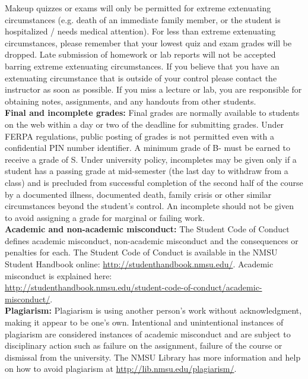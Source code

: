 \documentclass{article}
\begin{document}
Makeup quizzes or exams will only be permitted for extreme extenuating circumstances (e.g. death of an immediate family member, or the student is hospitalized / needs medical attention). For less than extreme extenuating circumstances, please remember that your lowest quiz and exam grades will be dropped. Late submission of homework or lab reports will not be accepted barring extreme extenuating circumstances. If you believe that you have an extenuating circumstance that is outside of your control please contact the instructor as soon as possible. If you miss a lecture or lab, you are responsible for obtaining notes, assignments, and any handouts from other students. \\

\noindent\textbf{Final and incomplete grades:} Final grades are normally available to students on the web within a day or two of the deadline for submitting grades. Under FERPA regulations, public posting of grades is not permitted even with a confidential PIN number identifier. A minimum grade of B- must be earned to receive a grade of S. Under university policy, incompletes may be given only if a student has a passing grade at mid-semester (the last day to withdraw from a class) and is precluded from successful completion of the second half of the course by a documented illness, documented death, family crisis or other similar circumstances beyond the student's control. An incomplete should not be given to avoid assigning a grade for marginal or failing work. \\

\noindent\textbf{Academic and non-academic misconduct:}
The Student Code of Conduct defines academic misconduct, non-academic misconduct and the consequences or penalties for each.  The Student Code of Conduct is available in the NMSU Student Handbook online:  \url{http://studenthandbook.nmsu.edu/}. Academic misconduct is explained here: \\ \url{http://studenthandbook.nmsu.edu/student-code-of-conduct/academic-misconduct/}. \\

\noindent\textbf{Plagiarism:} Plagiarism is using another person's work without acknowledgment, making it appear to be one's own. Intentional and unintentional instances of plagiarism are considered instances of academic misconduct and are subject to disciplinary action such as failure on the assignment, failure of the course or dismissal from the university. The NMSU Library has more information and help on how to avoid plagiarism at \url{http://lib.nmsu.edu/plagiarism/}. \\
\end{document}
